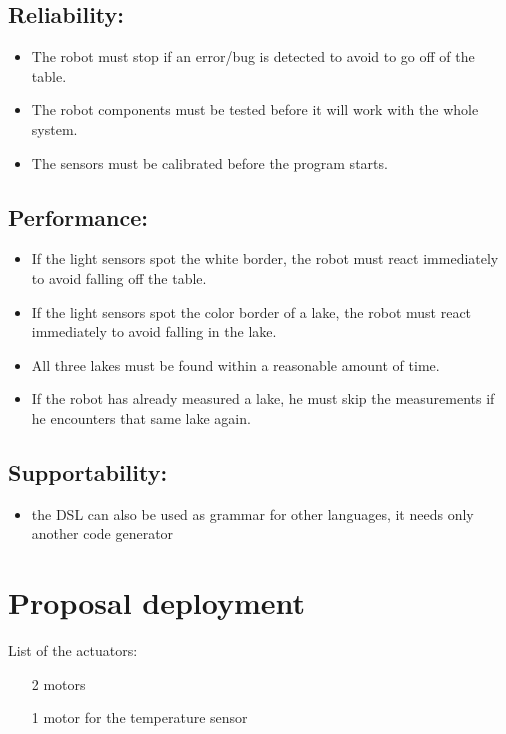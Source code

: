 \documentclass[10pt,a4paper]{article}
\begin{document}
\subsection*{Reliability:}
\begin{itemize}
\item The robot must stop if an error/bug is detected to avoid to go off of the table. 
\item The robot components must be tested before it will work with the whole system.
\item The sensors must be calibrated before the program starts.
\end{itemize}

\subsection*{Performance:}
\begin{itemize}
\item If the light sensors spot the white border, the robot must react immediately to avoid falling off the table.
\item If the light sensors spot the color border of a lake, the robot must react immediately to avoid falling in the lake.
\item All three lakes must be found within a reasonable amount of time.
\item If the robot has already measured a lake, he must skip the measurements if he encounters that same lake again.
\end{itemize}

\subsection*{Supportability:}
\begin{itemize}
\item the DSL can also be used as grammar for other languages, it needs only another code generator
\end{itemize}


\section*{Proposal deployment}
List of the actuators:
\begin{itemize}
\item[2] motors
\item[1] motor for  the temperature sensor
\end{itemize}
\end{document}

